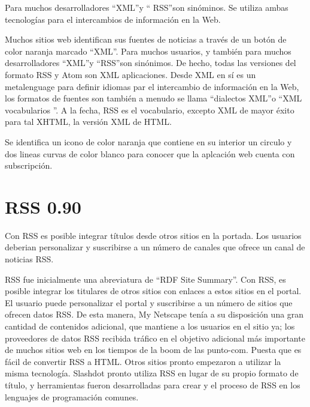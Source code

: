 Para muchos desarrolladores \textquotedblleft XML\textquotedblright y \textquotedblleft
RSS\textquotedblright son sin\'{o}minos. Se utiliza ambas tecnolog\'{i}as para el 
intercambios de informaci\'{o}n en la Web.

Muchos sitios web identifican sus fuentes de noticias a trav\'{e}s de un bot\'{o}n
de color naranja marcado \textquotedblleft XML\textquotedblright. Para muchos usuarios,
y tambi\'{e}n para muchos desarrolladores \textquotedblleft XML\textquotedblright  y
\textquotedblleft RSS\textquotedblright son sin\'{o}nimos. De hecho, todas las versiones
del formato RSS y Atom son XML aplicaciones. Desde XML en s\'{i} es un metalenguage para
definir idiomas par el intercambio de informaci\'{o}n en la Web, los formatos de fuentes
son tambi\'{e}n a menudo se llama \textquotedblleft dialectos XML\textquotedblright  o 
\textquotedblleft XML vocabularios \textquotedblright. A la fecha, RSS es el vocabulario, 
excepto XML de mayor \'{e}xito para tal XHTML, la versi\'{o}n XML de HTML.\cite{wittenbrink2005rss}

Se identifica un icono de color naranja que contiene en su interior un circulo y dos
lineas curvas de color blanco para conocer que la aplcaci\'{o}n web cuenta con 
subscripci\'{o}n.

\section{RSS 0.90}

Con RSS es posible integrar t\'{i}tulos desde otros sitios en la portada. Los 
usuarios deberian personalizar y suscribirse a un n\'{u}mero de canales que 
ofrece un canal de noticias RSS.

RSS fue inicialmente una abreviatura de \textquotedblleft RDF Site Summary\textquotedblright.
Con RSS, es posible integrar los titulares de otros sitios con enlaces a estos sitios en el 
portal. El usuario puede personalizar el portal y suscribirse a un n\'{u}mero de sitios que
ofrecen datos RSS. De esta manera, My Netscape ten\'{i}a a su disposici\'{o}n una gran 
cantidad de contenidos adicional, que mantiene a los usuarios en el sitio ya; los proveedores
de datos RSS recibida tr\'{a}fico en el objetivo adicional m\'{a}s importante de muchos
sitios web en los tiempos de la boom de las punto-com. Puesta que es f\'{a}cil de convertir
RSS a HTML. Otros sitios pronto empezaron a utilizar la misma tecnolog\'{i}a. Slashdot pronto
utiliza RSS en lugar de su propio formato de t\'{i}tulo, y herramientas fueron desarrolladas
para crear y el proceso de RSS en los lenguajes de programaci\'{o}n comunes.\cite{wittenbrink2005rss}


